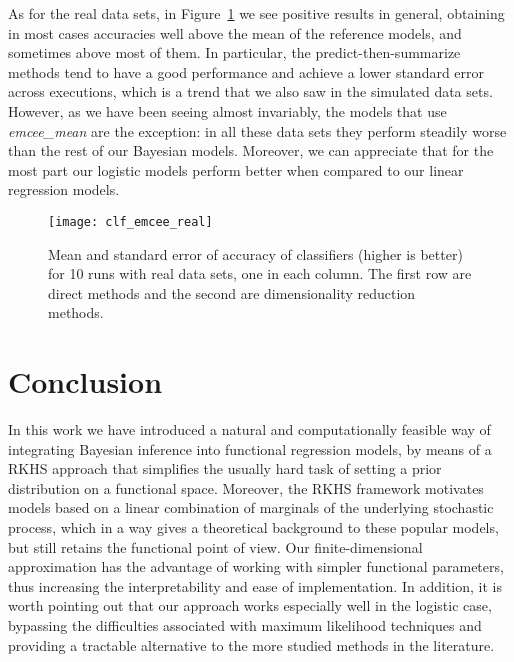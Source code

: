 \documentclass{article}
\numberwithin{equation}{section}
\theoremstyle{plain}
\begin{document}
As for the real data sets, in Figure~\ref{fig:clf_emcee_real} we see positive results in general, obtaining in most cases accuracies well above the mean of the reference models, and sometimes above most of them. In particular, the predict-then-summarize methods tend to have a good performance and achieve a lower standard error across executions, which is a trend that we also saw in the simulated data sets. However, as we have been seeing almost invariably, the models that use \textit{emcee\_mean} are the exception: in all these data sets they perform steadily worse than the rest of our Bayesian models. Moreover, we can appreciate that for the most part our logistic models perform better when compared to our linear regression models.

\begin{figure}[ht!]
  \centering
  \texttt{[image: clf\_emcee\_real]}
  \caption{Mean and standard error of accuracy of classifiers (higher is better) for 10 runs with real data sets, one in each column. The first row are direct methods and the second are dimensionality reduction methods.}\label{fig:clf_emcee_real}
\end{figure}


\section{Conclusion}\label{sec:conclusion}

In this work we have introduced a natural and computationally feasible way of integrating Bayesian inference into functional regression models, by means of a RKHS approach that simplifies the usually hard task of setting a prior distribution on a functional space. Moreover, the RKHS framework motivates models based on a linear combination of marginals of the underlying stochastic process, which in a way gives a theoretical background to these popular models, but still retains the functional point of view. Our finite-dimensional approximation has the advantage of working with simpler functional parameters, thus increasing the interpretability and ease of implementation. In addition, it is worth pointing out that our approach works especially well in the logistic case, bypassing the difficulties associated with maximum likelihood techniques and providing a tractable alternative to the more studied methods in the literature.
\end{document}
